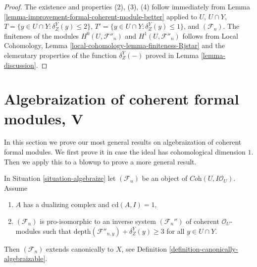 \begin{proof}
The existence and properties (2), (3), (4) follow immediately from
Lemma \ref{lemma-improvement-formal-coherent-module-better} applied
to $U$, $U \cap Y$, $T = \{y \in U \cap Y : \delta^Y_Z(y) \leq 2\}$,
$T' = \{y \in U \cap Y : \delta^Y_Z(y) \leq 1\}$, and $(\mathcal{F}_n)$.
The finiteness of the modules $H^0(U, \mathcal{F}''_n)$ and
$H^1(U, \mathcal{F}''_n)$ follows from
Local Cohomology, Lemma \ref{local-cohomology-lemma-finiteness-Rjstar}
and the elementary properties of the function $\delta^Y_Z(-)$
proved in Lemma \ref{lemma-discussion}.
\end{proof}











\section{Algebraization of coherent formal modules, V}
\label{section-algebraization-modules-conclusion}

\noindent
In this section we prove our most general results on algebraization
of coherent formal modules. We first prove it in case
the ideal has cohomological dimension $1$. Then we apply this
to a blowup to prove a more general result.

\begin{lemma}
\label{lemma-cd-1-canonical}
In Situation \ref{situation-algebraize} let $(\mathcal{F}_n)$
be an object of $\textit{Coh}(U, I\mathcal{O}_U)$. Assume
\begin{enumerate}
\item $A$ has a dualizing complex and $\text{cd}(A, I) = 1$,
\item $(\mathcal{F}_n)$ is pro-isomorphic to an inverse system
$(\mathcal{F}_n'')$ of coherent $\mathcal{O}_U$-modules such that
$\text{depth}(\mathcal{F}''_{n, y}) + \delta^Y_Z(y) \geq 3$
for all $y \in U \cap Y$.
\end{enumerate}
Then $(\mathcal{F}_n)$ extends canonically to $X$, see
Definition \ref{definition-canonically-algebraizable}.
\end{lemma}


